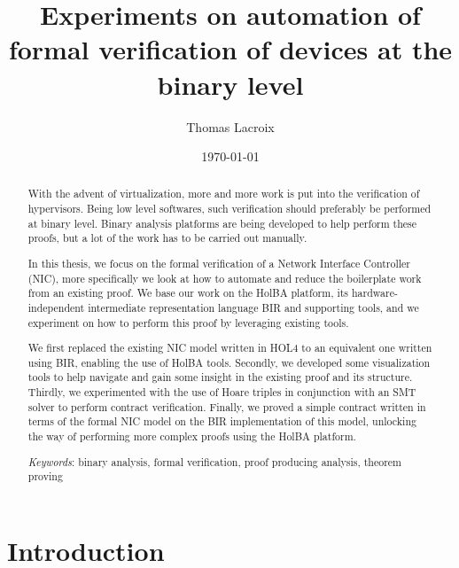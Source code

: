 \documentclass{kththesis}
\title{Experiments on automation of formal verification of devices at the binary level}
\author{Thomas Lacroix}
\date{\today}
\begin{document}
\frontmatter %

\titlepage

\begin{abstract}
  With the advent of virtualization, more and more work is put into the verification of hypervisors. Being low level softwares, such verification should preferably be performed at binary level. Binary analysis platforms are being developed to help perform these proofs, but a lot of the work has to be carried out manually.
  
  In this thesis, we focus on the formal verification of a Network Interface Controller (NIC), more specifically we look at how to automate and reduce the boilerplate work from an existing proof. We base our work on the HolBA platform, its hardware-independent intermediate representation language BIR and supporting tools, and we experiment on how to perform this proof by leveraging existing tools.
  
  We first replaced the existing NIC model written in HOL4 to an equivalent one written using BIR, enabling the use of HolBA tools. Secondly, we developed some visualization tools to help navigate and gain some insight in the existing proof and its structure. Thirdly, we experimented with the use of Hoare triples in conjunction with an SMT solver to perform contract verification. Finally, we proved a simple contract written in terms of the formal NIC model on the BIR implementation of this model, unlocking the way of performing more complex proofs using the HolBA platform.
  
  \textit{Keywords}: binary analysis, formal verification, proof producing analysis, theorem proving
\end{abstract}


\tableofcontents

\printglossaries

\mainmatter %

\chapter{Introduction}
\end{document}
